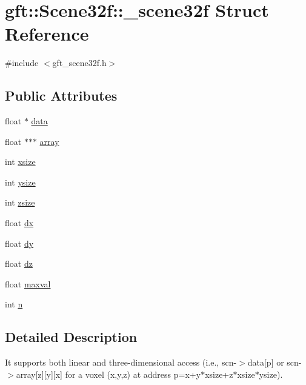 \hypertarget{structgft_1_1Scene32f_1_1__scene32f}{\section{gft\-:\-:Scene32f\-:\-:\-\_\-scene32f Struct Reference}
\label{structgft_1_1Scene32f_1_1__scene32f}
}


{\ttfamily \#include $<$gft\-\_\-scene32f.\-h$>$}

\subsection*{Public Attributes}
\begin{DoxyCompactItemize}
\item 
float $\ast$ \hyperlink{structgft_1_1Scene32f_1_1__scene32f_a48c77000dc972198c1e0220e134b7fa3}{data}
\item 
float $\ast$$\ast$$\ast$ \hyperlink{structgft_1_1Scene32f_1_1__scene32f_a3a807a5184276499e5ed8c4f0bc0231f}{array}
\item 
int \hyperlink{structgft_1_1Scene32f_1_1__scene32f_a32ab97e321670304cc58d77a93f6ae98}{xsize}
\item 
int \hyperlink{structgft_1_1Scene32f_1_1__scene32f_ae43a5a80f36b566a064c204195b0d97e}{ysize}
\item 
int \hyperlink{structgft_1_1Scene32f_1_1__scene32f_a2edf3aef02f61feb5b316fc0ee3db854}{zsize}
\item 
float \hyperlink{structgft_1_1Scene32f_1_1__scene32f_a1547544d49357f4fade40bc93ffb1d17}{dx}
\item 
float \hyperlink{structgft_1_1Scene32f_1_1__scene32f_aa33058e48dc15e753b50e59ec2a935d7}{dy}
\item 
float \hyperlink{structgft_1_1Scene32f_1_1__scene32f_a901514039bf88c7c6373c9e1980416f4}{dz}
\item 
float \hyperlink{structgft_1_1Scene32f_1_1__scene32f_ab041f7af2382a7c2088b2e2257bbe2d3}{maxval}
\item 
int \hyperlink{structgft_1_1Scene32f_1_1__scene32f_af712496c9e2a26f8e761c2dcd0433ab9}{n}
\end{DoxyCompactItemize}


\subsection{Detailed Description}
It supports both linear and three-\/dimensional access (i.\-e., scn-\/$>$data\mbox{[}p\mbox{]} or scn-\/$>$array\mbox{[}z\mbox{]}\mbox{[}y\mbox{]}\mbox{[}x\mbox{]} for a voxel (x,y,z) at address p=x+y$\ast$xsize+z$\ast$xsize$\ast$ysize). 

